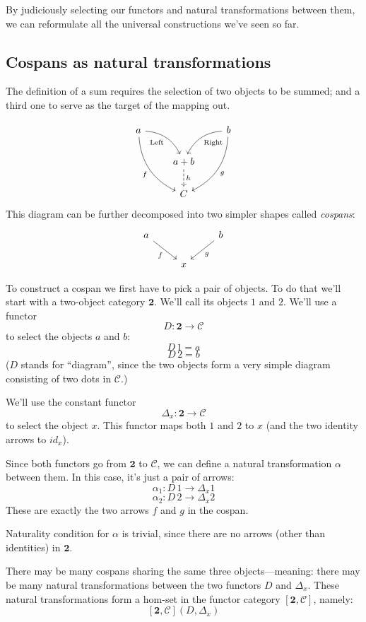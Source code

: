 \documentclass[DaoFP]{subfiles}
\begin{document}
By judiciously selecting our functors and natural transformations between them, we can reformulate all the universal constructions we've seen so far.

\subsection{Cospans as natural transformations}

The definition of a sum requires the selection of two objects to be summed; and a third one to serve as the target of the mapping out.

\[
 \begin{tikzcd}
 a
 \arrow[dr,  bend left, "\text{Left}"']
 \arrow[ddr, bend right, "f"']
 && b
 \arrow[dl, bend right, "\text{Right}"]
 \arrow[ddl, bend left, "g"]
 \\
&a + b
\arrow[d, dashed, "h"]
\\
& C
 \end{tikzcd}
\]
This diagram can be further decomposed into two simpler shapes called \emph{cospans}:
\[
 \begin{tikzcd}
 a
 \arrow[dr, "f"']
 && b
 \arrow[dl, "g"]
 \\
 & x
 \end{tikzcd}
\]

To construct a cospan we first have to pick a pair of objects. To do that we'll start with a two-object category $\mathbf{2}$. We'll call its objects $1$ and $2$. 
We'll use a functor 
\[ D \colon \mathbf{2} \to \mathcal{C}\]
to select the objects $a$ and $b$: 
\[D\, 1 = a\]
\[ D\, 2 = b \]
($D$ stands for ``diagram'', since the two objects form a very simple diagram consisting of two dots in $\mathcal{C}$.)

We'll use the constant functor 
\[ \Delta_x \colon \mathbf{2} \to \mathcal{C} \]
to select the object $x$. This functor maps both $1$ and $2$ to $x$ (and the two identity arrows to $id_x$).

Since both functors go from $\mathbf{2}$ to $\mathcal{C}$, we can define a natural transformation $\alpha$ between them. In this case, it's just a pair of arrows:
\[ \alpha_1 \colon D \, 1 \to \Delta_x 1 \]
\[ \alpha_2 \colon D \, 2 \to \Delta_x 2 \]
These are exactly the two arrows $f$ and $g$ in the cospan. 

Naturality condition for $\alpha$ is trivial, since there are no arrows (other than identities) in $\mathbf{2}$.

There may be many cospans sharing the same three objects---meaning: there may be many natural transformations between the two functors $D$ and  $\Delta_x$. These natural transformations form a hom-set in the functor category $[\mathbf{2}, \mathcal{C}]$, namely:
\[ [\mathbf{2}, \mathcal{C}](D, \Delta_x) \]
\end{document}
